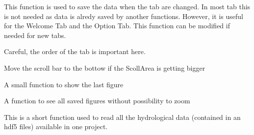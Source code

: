 \documentclass[letterpaper,10pt,english]{sphinxmanual}
\begin{document}
\begin{fulllineitems}
\begin{fulllineitems}
\end{fulllineitems}


\begin{fulllineitems}
\label{\detokenize{index:src_GUI.Main_windows_1.CentralW.save_on_change_tab}}
This function is used to save the data when the tab are changed. In most tab this is not needed as data
is alredy saved by another functions. However, it is useful for the Welcome Tab and the Option Tab.
This function can be modified if needed for new tabs.

Careful, the order of the tab is important here.

\end{fulllineitems}


\begin{fulllineitems}
\label{\detokenize{index:src_GUI.Main_windows_1.CentralW.scrolldown}}
Move the scroll bar to the bottow if the ScollArea is getting bigger

\end{fulllineitems}


\begin{fulllineitems}
\label{\detokenize{index:src_GUI.Main_windows_1.CentralW.showfig}}
A small function to show the last figure

\end{fulllineitems}


\begin{fulllineitems}
\label{\detokenize{index:src_GUI.Main_windows_1.CentralW.showfig2}}
A function to see all saved figures without possibility to zoom

\end{fulllineitems}


\begin{fulllineitems}
\label{\detokenize{index:src_GUI.Main_windows_1.CentralW.update_hydro_hdf5_name}}
This is a short function used to read all the hydrological data (contained in an hdf5 files) available in
one project.


\end{fulllineitems}
\end{fulllineitems}
\end{document}
